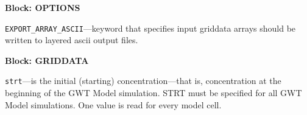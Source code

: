 
\item \textbf{Block: OPTIONS}

\begin{description}
\item \texttt{EXPORT\_ARRAY\_ASCII}---keyword that specifies input griddata arrays should be written to layered ascii output files.

\end{description}
\item \textbf{Block: GRIDDATA}

\begin{description}
\item \texttt{strt}---is the initial (starting) concentration---that is, concentration at the beginning of the GWT Model simulation.  STRT must be specified for all GWT Model simulations. One value is read for every model cell.

\end{description}

